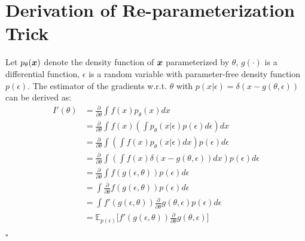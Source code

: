 \section{Derivation of Re-parameterization Trick}\label{d_repa}
Let $p_\theta(\boldsymbol x)$ denote the density function of $\boldsymbol x$ parameterized by $\theta$, $g(\cdot)$ is a differential function, $\epsilon$ is a random variable with parameter-free density function $p(\epsilon)$. The estimator of the gradients w.r.t. $\theta$ with $p(x|\epsilon) = \delta(x-g(\theta,\epsilon))$ can be derived as:
\begin{equation}
\begin{aligned}
I'(\theta) &= \frac{\partial}{\partial \theta} \int f(x) p_{\theta}(x) dx \\
&= \frac{\partial}{\partial \theta} \int f(x)(\int p_{\theta}(x|\epsilon)p(\epsilon)d\epsilon) dx \\
&= \frac{\partial}{\partial \theta} \int (\int f(x) p_{\theta}(x|\epsilon)dx) p(\epsilon) d\epsilon \\
&= \frac{\partial}{\partial \theta} \int (\int f(x)\delta(x-g(\theta,\epsilon))dx) p(\epsilon) d\epsilon \\ 
&= \frac{\partial}{\partial \theta} \int f(g(\epsilon, \theta)) p(\epsilon) d\epsilon \\
&= \int \frac{\partial}{\partial \theta} f(g(\epsilon, \theta)) p(\epsilon) d\epsilon \\
&= \int f'(g(\epsilon, \theta))\frac{\partial}{\partial \theta}g(\theta, \epsilon) p(\epsilon) d\epsilon \\
&= \mathbb E_{p(\epsilon)}\big[ f'(g(\epsilon, \theta))\frac{\partial}{\partial \theta}g(\theta, \epsilon)\big] 
\end{aligned}
\end{equation} 
 \begin{flushright}
	$\square$
\end{flushright}
